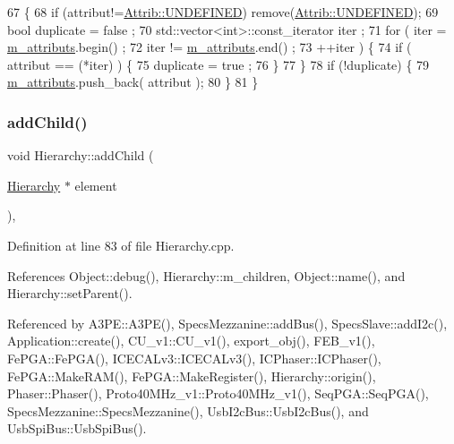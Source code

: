 \begin{DoxyCode}
67                             \{
68     \textcolor{keywordflow}{if} (attribut!=\hyperlink{classAttrib_a69e171d7cc6417835a5a306d3c764235a3a8da2ab97dda18aebab196fe4100531}{Attrib::UNDEFINED}) \textcolor{keyword}{remove}(\hyperlink{classAttrib_a69e171d7cc6417835a5a306d3c764235a3a8da2ab97dda18aebab196fe4100531}{Attrib::UNDEFINED});
69     \textcolor{keywordtype}{bool} duplicate = false ;
70     std::vector<int>::const\_iterator iter ;
71     \textcolor{keywordflow}{for} ( iter  = \hyperlink{classAttrib_ac4bd58a0cc6b38a3b711d609a3d3aacc}{m\_attributs}.begin() ;
72           iter != \hyperlink{classAttrib_ac4bd58a0cc6b38a3b711d609a3d3aacc}{m\_attributs}.end()   ;
73           ++iter ) \{
74       \textcolor{keywordflow}{if} ( attribut == (*iter) ) \{
75         duplicate = true ;
76       \}
77     \}
78     \textcolor{keywordflow}{if} (!duplicate) \{
79       \hyperlink{classAttrib_ac4bd58a0cc6b38a3b711d609a3d3aacc}{m\_attributs}.push\_back( attribut );
80     \}
81   \}
\end{DoxyCode}
\mbox{\label{classHierarchy_ad677774ff38fcb257c04a3a10d471fac}} 
\subsubsection{\texorpdfstring{add\+Child()}{addChild()}}
{\footnotesize\ttfamily void Hierarchy\+::add\+Child (\begin{DoxyParamCaption}\item[{\hyperlink{classHierarchy}{Hierarchy} $\ast$}]{element }\end{DoxyParamCaption})\hspace{0.3cm}{\ttfamily [virtual]}, {\ttfamily [inherited]}}



Definition at line 83 of file Hierarchy.\+cpp.



References Object\+::debug(), Hierarchy\+::m\+\_\+children, Object\+::name(), and Hierarchy\+::set\+Parent().



Referenced by A3\+P\+E\+::\+A3\+P\+E(), Specs\+Mezzanine\+::add\+Bus(), Specs\+Slave\+::add\+I2c(), Application\+::create(), C\+U\+\_\+v1\+::\+C\+U\+\_\+v1(), export\+\_\+obj(), F\+E\+B\+\_\+v1(), Fe\+P\+G\+A\+::\+Fe\+P\+G\+A(), I\+C\+E\+C\+A\+Lv3\+::\+I\+C\+E\+C\+A\+Lv3(), I\+C\+Phaser\+::\+I\+C\+Phaser(), Fe\+P\+G\+A\+::\+Make\+R\+A\+M(), Fe\+P\+G\+A\+::\+Make\+Register(), Hierarchy\+::origin(), Phaser\+::\+Phaser(), Proto40\+M\+Hz\+\_\+v1\+::\+Proto40\+M\+Hz\+\_\+v1(), Seq\+P\+G\+A\+::\+Seq\+P\+G\+A(), Specs\+Mezzanine\+::\+Specs\+Mezzanine(), Usb\+I2c\+Bus\+::\+Usb\+I2c\+Bus(), and Usb\+Spi\+Bus\+::\+Usb\+Spi\+Bus().


